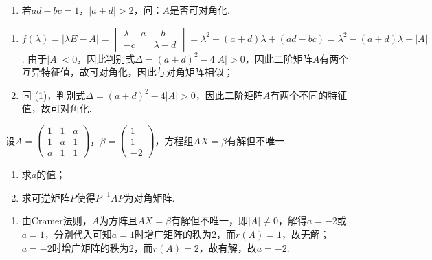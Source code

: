 \begin{exercise}
\begin{exgroup}
\begin{enumerate}
            \item 若$ad-bc=1$，$|a+d|>2$，问：$A$是否可对角化.
        \end{enumerate}
        \begin{answer}
            \begin{enumerate}
                \item $f(\lambda)=|\lambda E-A|=\begin{vmatrix}
                              \lambda-a & -b \\ -c & \lambda-d
                          \end{vmatrix}=\lambda^2-(a+d)\lambda+(ad-bc)=\lambda^2-(a+d)\lambda+|A|$. 由于$|A|<0$，因此判别式$\Delta=(a+d)^2-4|A|>0$，因此二阶矩阵$A$有两个互异特征值，故可对角化，因此与对角矩阵相似；

                \item 同 (1)，判别式$\Delta=(a+d)^2-4|A|>0$，因此二阶矩阵$A$有两个不同的特征值，故可对角化.
            \end{enumerate}
        \end{answer}
        \item 设$A=\begin{pmatrix}
                1 & 1 & a \\
                1 & a & 1 \\
                a & 1 & 1
            \end{pmatrix}$，$\beta=\begin{pmatrix}
                1 \\ 1 \\ -2
            \end{pmatrix}$，方程组$AX=\beta$有解但不唯一.
        \begin{enumerate}
            \item 求$a$的值；

            \item 求可逆矩阵$P$使得$P^{-1}AP$为对角矩阵.
        \end{enumerate}
        \begin{answer}
            \begin{enumerate}
              \item 由Cramer法则，$A$为方阵且$AX=\beta$有解但不唯一，即$|A|\neq 0$，解得$a=-2$或$a=1$，分别代入可知$a=1$时增广矩阵的秩为2，而$r(A)=1$，故无解；$a=-2$时增广矩阵的秩为2，而$r(A)=2$，故有解，故$a=-2$.


\end{enumerate}
\end{answer}
\end{exgroup}
\end{exercise}
